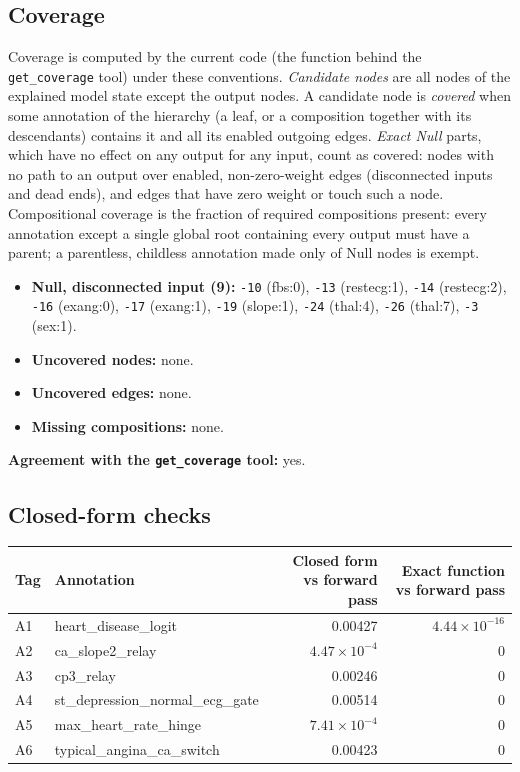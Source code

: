 \begin{drafted}
\subsection{Coverage}\label{app:heart-s1-c1:coverage}
Coverage is computed by the current code (the function behind the \texttt{get\_coverage} tool) under these conventions. \emph{Candidate nodes} are all nodes of the explained model state except the output nodes. A candidate node is \emph{covered} when some annotation of the hierarchy (a leaf, or a composition together with its descendants) contains it and all its enabled outgoing edges. \emph{Exact Null} parts, which have no effect on any output for any input, count as covered: nodes with no path to an output over enabled, non-zero-weight edges (disconnected inputs and dead ends), and edges that have zero weight or touch such a node. Compositional coverage is the fraction of required compositions present: every annotation except a single global root containing every output must have a parent; a parentless, childless annotation made only of Null nodes is exempt.

\begin{itemize}
\item \textbf{Null, disconnected input (9):} \texttt{-10} (fbs:0), \texttt{-13} (restecg:1), \texttt{-14} (restecg:2), \texttt{-16} (exang:0), \texttt{-17} (exang:1), \texttt{-19} (slope:1), \texttt{-24} (thal:4), \texttt{-26} (thal:7), \texttt{-3} (sex:1).
\item \textbf{Uncovered nodes:} none.
\item \textbf{Uncovered edges:} none.
\item \textbf{Missing compositions:} none.
\end{itemize}
\noindent\textbf{Agreement with the \texttt{get\_coverage} tool:} yes.

\subsection{Closed-form checks}\label{app:heart-s1-c1:closedform}
{\small\noindent\begin{tabularx}{\linewidth}{@{}lXrr@{}}
\toprule Tag & Annotation & Closed form vs forward pass & Exact function vs forward pass \\ \midrule
A1 & heart\_\allowbreak{}disease\_\allowbreak{}logit & 0.00427 & $4.44\times 10^{-16}$ \\
A2 & ca\_\allowbreak{}slope2\_\allowbreak{}relay & $4.47\times 10^{-4}$ & 0 \\
A3 & cp3\_\allowbreak{}relay & 0.00246 & 0 \\
A4 & st\_\allowbreak{}depression\_\allowbreak{}normal\_\allowbreak{}ecg\_\allowbreak{}gate & 0.00514 & 0 \\
A5 & max\_\allowbreak{}heart\_\allowbreak{}rate\_\allowbreak{}hinge & $7.41\times 10^{-4}$ & 0 \\
A6 & typical\_\allowbreak{}angina\_\allowbreak{}ca\_\allowbreak{}switch & 0.00423 & 0 \\
\bottomrule
\end{tabularx}\par}

\end{drafted}
